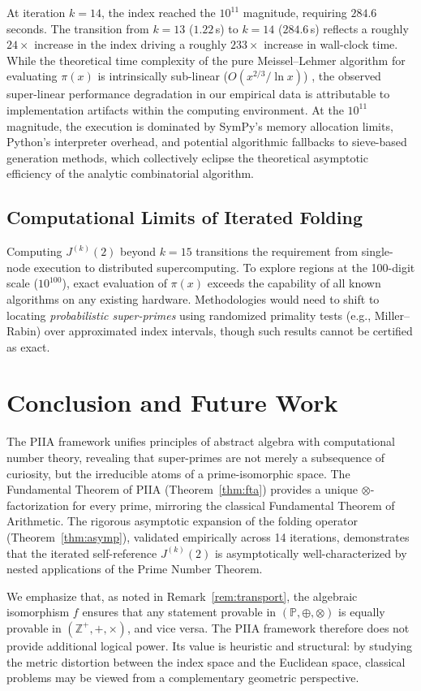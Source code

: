 \documentclass[11pt, a4paper]{article}
\begin{document}
At iteration $k=14$, the index reached the $10^{11}$ magnitude, requiring $284.6$ seconds. The transition from $k=13$ ($1.22\,$s) to $k=14$ ($284.6\,$s) reflects a roughly $24\times$ increase in the index driving a roughly $233\times$ increase in wall-clock time. While the theoretical time complexity of the pure Meissel--Lehmer algorithm for evaluating $\pi(x)$ is intrinsically sub-linear ($O(x^{2/3}/\ln x)$) \cite{lagarias}, the observed super-linear performance degradation in our empirical data is attributable to implementation artifacts within the computing environment. At the $10^{11}$ magnitude, the execution is dominated by SymPy's memory allocation limits, Python's interpreter overhead, and potential algorithmic fallbacks to sieve-based generation methods, which collectively eclipse the theoretical asymptotic efficiency of the analytic combinatorial algorithm.

\subsection{Computational Limits of Iterated Folding}
Computing $J^{(k)}(2)$ beyond $k = 15$ transitions the requirement from single-node execution to distributed supercomputing. To explore regions at the 100-digit scale ($10^{100}$), exact evaluation of $\pi(x)$ exceeds the capability of all known algorithms on any existing hardware. Methodologies would need to shift to locating \textit{probabilistic super-primes} using randomized primality tests (e.g., Miller--Rabin) over approximated index intervals, though such results cannot be certified as exact.

\section{Conclusion and Future Work}
The PIIA framework unifies principles of abstract algebra with computational number theory, revealing that super-primes are not merely a subsequence of curiosity, but the irreducible atoms of a prime-isomorphic space. The Fundamental Theorem of PIIA (Theorem~\ref{thm:fta}) provides a unique $\otimes$-factorization for every prime, mirroring the classical Fundamental Theorem of Arithmetic. The rigorous asymptotic expansion of the folding operator (Theorem~\ref{thm:asymp}), validated empirically across 14 iterations, demonstrates that the iterated self-reference $J^{(k)}(2)$ is asymptotically well-characterized by nested applications of the Prime Number Theorem.

We emphasize that, as noted in Remark~\ref{rem:transport}, the algebraic isomorphism $f$ ensures that any statement provable in $(\mathbb{P}, \oplus, \otimes)$ is equally provable in $(\mathbb{Z}^+, +, \times)$, and vice versa. The PIIA framework therefore does not provide additional logical power. Its value is heuristic and structural: by studying the metric distortion between the index space and the Euclidean space, classical problems may be viewed from a complementary geometric perspective.
\end{document}
